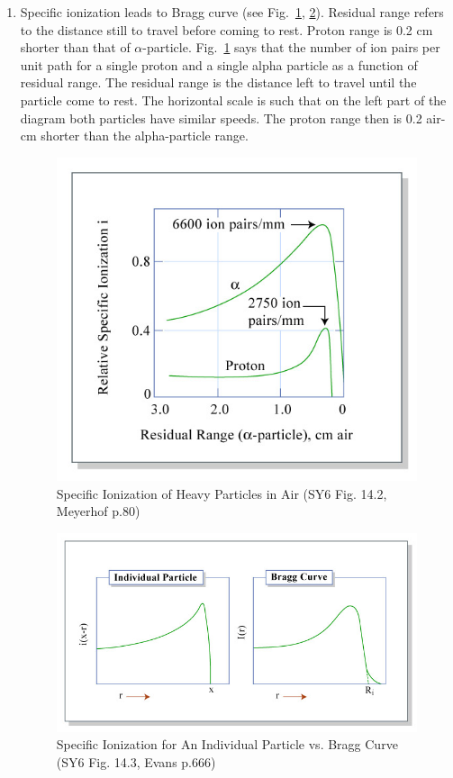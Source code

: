\documentclass{school-22.101-notes}
\begin{document}
\begin{enumerate}
\item Specific ionization leads to Bragg curve (see Fig.~\ref{14.2}, \ref{14.3}). Residual range refers to the distance still to travel before coming to rest. Proton range is 0.2 cm shorter than that of $\alpha$-particle. Fig.~\ref{14.2} says that the number of ion pairs per unit path for a single proton and a single alpha particle as a function of residual range. The residual range is the distance left to travel until the particle come to rest. The horizontal scale is such that on the left part of the diagram both particles have similar speeds. The proton range then is 0.2 air-cm shorter than the alpha-particle range. 
\begin{figure}[ht]
  \centering
  \includegraphics[width=5in]{images/ni/14.2.png}
  \caption{Specific Ionization of Heavy Particles in Air (SY6 Fig. 14.2, Meyerhof p.80)} \label{14.2}
\end{figure}

\begin{figure}[ht]
  \centering
  \includegraphics[width=5in]{images/ni/14.3.png}
  \caption{Specific Ionization for An Individual Particle vs. Bragg Curve (SY6 Fig. 14.3, Evans p.666)} \label{14.3}
\end{figure}



\end{enumerate}
\end{document}
